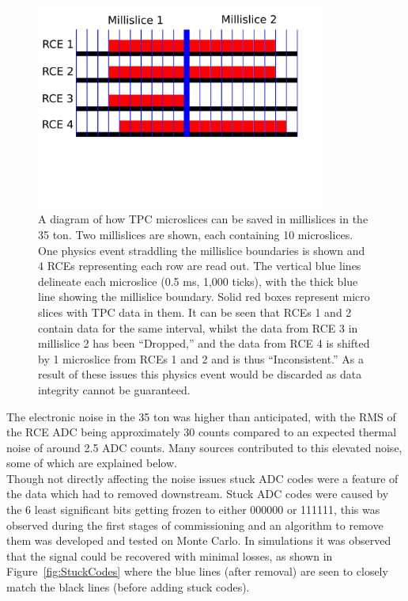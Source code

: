 \begin{figure}[h!]
  \centering
  \includegraphics[width=0.85\textwidth]{DataDrops}
  \caption[Dropped TPC data in the 35 ton]{A diagram of how TPC microslices can be saved in millislices in the 35 ton. Two millislices are shown, each containing 10 microslices. One physics event straddling the millislice boundaries is shown and 4 RCEs representing each row are read out. The vertical blue lines delineate each microslice (0.5 ms, 1,000 ticks), with the thick blue line showing the millislice boundary. Solid red boxes represent micro slices with TPC data in them. It can be seen that RCEs 1 and 2 contain data for the same interval, whilst the data from RCE 3 in millislice 2 has been ``Dropped,'' and the data from RCE 4 is shifted by 1 microslice from RCEs 1 and 2 and is thus ``Inconsistent.'' As a result of these issues this physics event would be discarded as data integrity cannot be guaranteed.}
  \label{fig:DataDrops}
\end{figure}

The electronic noise in the 35 ton was higher than anticipated, with the RMS of the RCE ADC being approximately 30 counts compared to an expected thermal noise of around 2.5 ADC counts. Many sources contributed to this elevated noise, some of which are explained below. \\

Though not directly affecting the noise issues stuck ADC codes were a feature of the data which had to removed downstream. Stuck ADC codes were caused by the 6 least significant bits getting frozen to either 000000 or 111111, this was observed during the first stages of commissioning and an algorithm to remove them was developed and tested on Monte Carlo. In simulations it was observed that the signal could be recovered with minimal losses, as shown in Figure~\ref{fig:StuckCodes} where the blue lines (after removal) are seen to closely match the black lines (before adding stuck codes). \\

